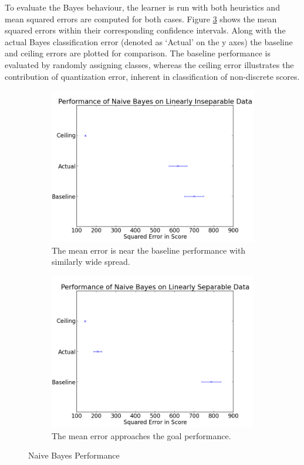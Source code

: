 \documentclass[12pt,notitlepage,twoside]{scrbook}
\begin{document}
To evaluate the Bayes behaviour, the learner is run with both heuristics and mean squared
errors are computed for both cases.  Figure \ref{fig:bayes_perf} shows the mean squared
errors within their corresponding confidence intervals.  Along with the actual Bayes
classification error (denoted as `Actual' on the y axes) the baseline and ceiling errors
are plotted for comparison. The baseline performance is evaluated by randomly assigning
classes, whereas the ceiling error illustrates the contribution of quantization error,
inherent in classification of non-discrete scores.

\begin{figure}[h]
  \begin{subfigure}[b]{0.49\textwidth}
    \centering
 \includegraphics[width=\linewidth]{figs/insep.png}
 \caption{The mean error is near the baseline performance
 with similarly wide spread. \label{insep}}
\end{subfigure}
\quad
\begin{subfigure}[b]{0.49\textwidth}
  \centering
  \includegraphics[width=\linewidth]{figs/sep.png}
  \caption{The mean error
  approaches the goal performance. \label{sep}}
\end{subfigure}
\caption{Naive Bayes Performance \label{fig:bayes_perf}}
\end{figure}
\end{document}
